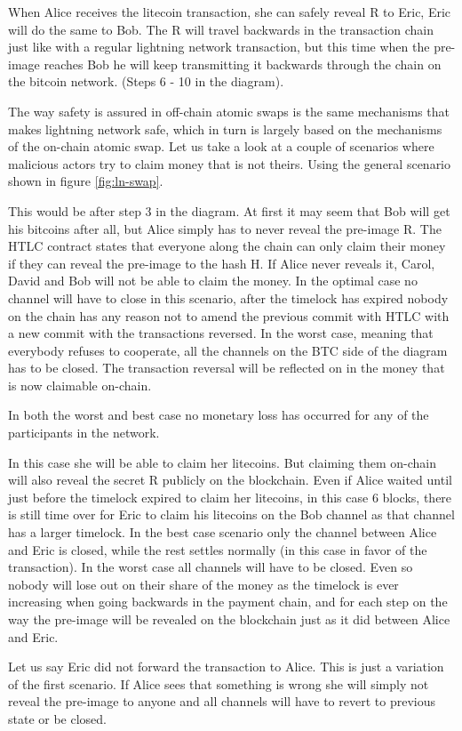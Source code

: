 When Alice receives the litecoin transaction, she can safely reveal R to Eric, Eric will do the same to Bob. The R will travel backwards in the transaction chain just like with a regular lightning network transaction, but this time when the pre-image reaches Bob he will keep transmitting it backwards through the chain on the bitcoin network. (Steps 6 - 10 in the diagram).

The way safety is assured in off-chain atomic swaps is the same mechanisms that makes lightning network safe, which in turn is largely based on the mechanisms of the on-chain atomic swap. 
Let us take a look at a couple of scenarios where malicious actors try to claim money that is not theirs. Using the general scenario shown in figure \ref{fig:ln-swap}.

This would be after step 3 in the diagram. At first it may seem that Bob will get his bitcoins after all, but Alice simply has to never reveal the pre-image R. The HTLC contract states that everyone along the chain can only claim their money if they can reveal the pre-image to the hash H. If Alice never reveals it, Carol, David and Bob will not be able to claim the money. In the optimal case no channel will have to close in this scenario, after the timelock has expired nobody on the chain has any reason not to amend the previous commit with HTLC with a new commit with the transactions reversed. In the worst case, meaning that everybody refuses to cooperate, all the channels on the BTC side of the diagram has to be closed. The transaction reversal will be reflected on in the money that is now claimable on-chain.

In both the worst and best case no monetary loss has occurred for any of the participants in the network.

In this case she will be able to claim her litecoins. But claiming them on-chain will also reveal the secret R publicly on the blockchain. Even if Alice waited until just before the timelock expired to claim her litecoins, in this case 6 blocks, there is still time over for Eric to claim his litecoins on the Bob channel as that channel has a larger timelock. In the best case scenario only the channel between Alice and Eric is closed, while the rest settles normally (in this case in favor of the transaction). In the worst case all channels will have to be closed. Even so nobody will lose out on their share of the money as the timelock is ever increasing when going backwards in the payment chain, and for each step on the way the pre-image will be revealed on the blockchain just as it did between Alice and Eric. 

Let us say Eric did not forward the transaction to Alice. This is just a variation of the first scenario. If Alice sees that something is wrong she will simply not reveal the pre-image to anyone and all channels will have to revert to previous state or be closed.